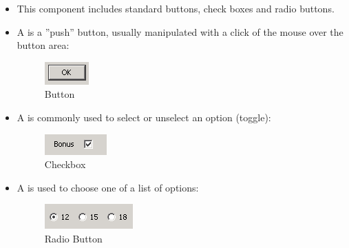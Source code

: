 
\begin{itemize}
\item This component includes standard buttons, check boxes and radio buttons.
\item A  is a ''push'' button, 
usually manipulated with a click of the mouse over the button area:

\begin{figure}
\begin{center}
\includegraphics{PS/Button}
\caption{Button}
\label{button}
\end{center}
\end{figure}

\item A  is commonly used to select or unselect an option (toggle):

\begin{figure}
\begin{center}
\includegraphics{PS/Checkbox}
\caption{Checkbox}
\label{checkbox}
\end{center}
\end{figure}

\item A  is used to choose one of a list of options:

\begin{figure}
\begin{center}
\includegraphics{PS/Radiobutton}
\caption{Radio Button}
\label{radiobutton}
\end{center}
\end{figure}
\end{itemize}
